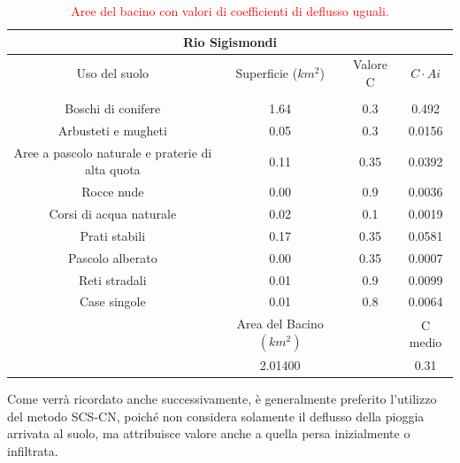 \begin{table}[H] \centering
    \caption{\textcolor{red}{Aree del bacino con valori di coefficienti di deflusso uguali.}}
    \begin{tabular}{cccc}
    \toprule
    \multicolumn{4}{c}{\textbf{Rio Sigismondi}}\\
    \midrule
    Uso del suolo & Superficie ($km^2$)      & Valore C           & $C\cdot Ai$    \\
    &   &  &     \\
    Boschi di conifere                               & 1.64                  & 0.3                & 0.492   \\
    Arbusteti e mugheti                              & 0.05                  & 0.3                & 0.0156  \\
    Aree a pascolo naturale e praterie di alta quota & 0.11                  & 0.35               & 0.0392  \\
    Rocce nude                                       & 0.00                  & 0.9                & 0.0036  \\
    Corsi di acqua naturale                          & 0.02                  & 0.1                & 0.0019  \\
    Prati stabili                                    & 0.17                  & 0.35               & 0.0581  \\
    Pascolo alberato                                 & 0.00                  & 0.35               & 0.0007  \\
    Reti stradali                                    & 0.01                  & 0.9                & 0.0099  \\
    Case singole                                     & 0.01                  & 0.8                & 0.0064  \\
    \midrule
& Area del Bacino $(km^2)$ &  & C medio \\
  & 2.01400               &                    & 0.31 \\
  \bottomrule  
    \end{tabular}
    \end{table}

Come verrà ricordato anche successivamente, è generalmente preferito l'utilizzo del metodo SCS-CN, poiché non considera solamente il deflusso della pioggia arrivata al suolo, ma attribuisce valore anche a quella persa inizialmente o infiltrata.    

